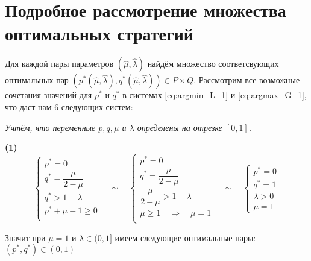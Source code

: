 \section{Подробное рассмотрение множества оптимальных стратегий}

Для каждой пары параметров $(\hat \mu, \hat \lambda)$ найдём множество
соответсвующих оптимальных пар 
$(p^*(\hat \mu, \hat \lambda), q^*(\hat \mu, \hat \lambda)) \in P \times Q$. 
Рассмотрим все возможные сочетания значений для $p^*$ и $q^*$ в системах 
\eqref{eq:argmin_L_1} и \eqref{eq:argmax_G_1}, что даст нам 6 следующих систем:

\hspace{5mm}

	\textit{Учтём, что переменные $p, q, \mu$ и $\lambda$ определены на отрезке $[0, 1]$.}
	
\textbf{(1)}
$$
	\begin{cases}
		p^* = 0 \\
		q^* = \dfrac{\mu}{2 - \mu} \\
		q^* > 1 - \lambda \\
		p^* + \mu - 1 \geqslant 0 \\
	\end{cases}
	\quad \sim \quad
	\begin{cases}
		p^* = 0 \\
		q^* = \dfrac{\mu}{2 - \mu} \\
		\dfrac{\mu}{2 - \mu} > 1 - \lambda \\
		\mu \geqslant 1 \quad \Rightarrow \quad \mu = 1 \\
	\end{cases}
	\quad \sim \quad
	\begin{cases}
		p^* = 0 \\
		q^* = 1 \\
		\lambda > 0 \\
		\mu = 1
	\end{cases}
$$

Значит при $\mu = 1$  и $\lambda \in (0,1]$ имеем следующие оптимальные пары:
$(p^*, q^*) \in (0, 1)$

\hspace{5mm}

